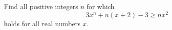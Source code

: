 Find all positive integers $n$ for which $$3x^n + n(x + 2) - 3 \geq  nx^2$$holds for all real numbers $x.$